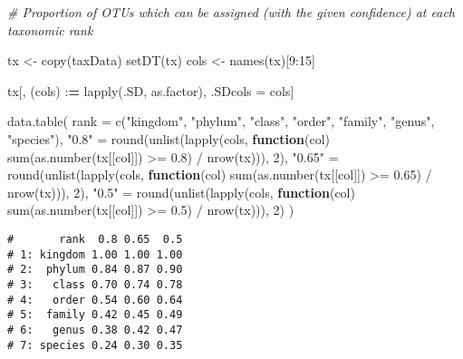 \documentclass[
]{article}
\newenvironment{Shaded}{\begin{snugshade}}{\end{snugshade}}
\newcommand{\AttributeTok}[1]{\textcolor[rgb]{0.77,0.63,0.00}{#1}}
\newcommand{\CommentTok}[1]{\textcolor[rgb]{0.56,0.35,0.01}{\textit{#1}}}
\newcommand{\ControlFlowTok}[1]{\textcolor[rgb]{0.13,0.29,0.53}{\textbf{#1}}}
\newcommand{\DecValTok}[1]{\textcolor[rgb]{0.00,0.00,0.81}{#1}}
\newcommand{\ErrorTok}[1]{\textcolor[rgb]{0.64,0.00,0.00}{\textbf{#1}}}
\newcommand{\FloatTok}[1]{\textcolor[rgb]{0.00,0.00,0.81}{#1}}
\newcommand{\FunctionTok}[1]{\textcolor[rgb]{0.00,0.00,0.00}{#1}}
\newcommand{\NormalTok}[1]{#1}
\newcommand{\OtherTok}[1]{\textcolor[rgb]{0.56,0.35,0.01}{#1}}
\newcommand{\SpecialCharTok}[1]{\textcolor[rgb]{0.00,0.00,0.00}{#1}}
\newcommand{\StringTok}[1]{\textcolor[rgb]{0.31,0.60,0.02}{#1}}
\begin{document}
\begin{Shaded}
\begin{Highlighting}[]
\CommentTok{\# Proportion of OTUs which can be assigned (with the given confidence) at each taxonomic rank}

\NormalTok{tx }\OtherTok{\textless{}{-}} \FunctionTok{copy}\NormalTok{(taxData)}
\FunctionTok{setDT}\NormalTok{(tx)}
\NormalTok{cols }\OtherTok{\textless{}{-}} \FunctionTok{names}\NormalTok{(tx)[}\DecValTok{9}\SpecialCharTok{:}\DecValTok{15}\NormalTok{]}

\NormalTok{tx[, (cols) }\SpecialCharTok{:}\ErrorTok{=} \FunctionTok{lapply}\NormalTok{(.SD, as.factor), .SDcols }\OtherTok{=}\NormalTok{ cols]}

\FunctionTok{data.table}\NormalTok{(}
  \AttributeTok{rank =} \FunctionTok{c}\NormalTok{(}\StringTok{"kingdom"}\NormalTok{, }\StringTok{"phylum"}\NormalTok{, }\StringTok{"class"}\NormalTok{, }\StringTok{"order"}\NormalTok{, }\StringTok{"family"}\NormalTok{, }\StringTok{"genus"}\NormalTok{, }\StringTok{"species"}\NormalTok{),}
  \StringTok{"0.8"} \OtherTok{=} \FunctionTok{round}\NormalTok{(}\FunctionTok{unlist}\NormalTok{(}\FunctionTok{lapply}\NormalTok{(cols, }\ControlFlowTok{function}\NormalTok{(col) }\FunctionTok{sum}\NormalTok{(}\FunctionTok{as.number}\NormalTok{(tx[[col]]) }\SpecialCharTok{\textgreater{}=} \FloatTok{0.8}\NormalTok{) }\SpecialCharTok{/} \FunctionTok{nrow}\NormalTok{(tx))), }\DecValTok{2}\NormalTok{),}
  \StringTok{"0.65"} \OtherTok{=} \FunctionTok{round}\NormalTok{(}\FunctionTok{unlist}\NormalTok{(}\FunctionTok{lapply}\NormalTok{(cols, }\ControlFlowTok{function}\NormalTok{(col) }\FunctionTok{sum}\NormalTok{(}\FunctionTok{as.number}\NormalTok{(tx[[col]]) }\SpecialCharTok{\textgreater{}=} \FloatTok{0.65}\NormalTok{) }\SpecialCharTok{/} \FunctionTok{nrow}\NormalTok{(tx))), }\DecValTok{2}\NormalTok{),}
  \StringTok{"0.5"} \OtherTok{=} \FunctionTok{round}\NormalTok{(}\FunctionTok{unlist}\NormalTok{(}\FunctionTok{lapply}\NormalTok{(cols, }\ControlFlowTok{function}\NormalTok{(col) }\FunctionTok{sum}\NormalTok{(}\FunctionTok{as.number}\NormalTok{(tx[[col]]) }\SpecialCharTok{\textgreater{}=} \FloatTok{0.5}\NormalTok{) }\SpecialCharTok{/} \FunctionTok{nrow}\NormalTok{(tx))), }\DecValTok{2}\NormalTok{)}
\NormalTok{)}
\end{Highlighting}
\end{Shaded}

\begin{verbatim}
#       rank  0.8 0.65  0.5
# 1: kingdom 1.00 1.00 1.00
# 2:  phylum 0.84 0.87 0.90
# 3:   class 0.70 0.74 0.78
# 4:   order 0.54 0.60 0.64
# 5:  family 0.42 0.45 0.49
# 6:   genus 0.38 0.42 0.47
# 7: species 0.24 0.30 0.35
\end{verbatim}
\end{document}

